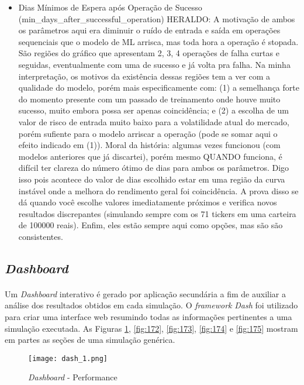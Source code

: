 \begin{itemize}
    \item Dias Mínimos de Espera após Operação de Sucesso (min\_days\_after\_successful\_operation)
    \color{red} HERALDO: A motivação de ambos os parâmetros aqui era diminuir o ruído de entrada e saída em operações sequenciais que o modelo de ML arrisca, mas toda hora a operação é stopada. São regiões do gráfico que apresentam 2, 3, 4 operações de falha curtas e seguidas, eventualmente com uma de sucesso e já volta pra falha. Na minha interpretação, os motivos da existência dessas regiões tem a ver com a qualidade do modelo, porém mais especificamente com: (1) a semelhança forte do momento presente com um passado de treinamento onde houve muito sucesso, muito embora possa ser apenas coincidência; e (2) a escolha de um valor de risco de entrada muito baixo para a volatilidade atual do mercado, porém sufiente para o modelo arriscar a operação (pode se somar aqui o efeito indicado em (1)). Moral da história: algumas vezes funcionou (com modelos anteriores que já discartei), porém mesmo QUANDO funciona, é difícil ter clareza do número ótimo de dias para ambos os parâmetros. Digo isso pois acontece do valor de dias escolhido estar em uma região da curva instável onde a melhora do rendimento geral foi coincidência. A prova disso se dá quando você escolhe valores imediatamente próximos e verifica novos resultados discrepantes (simulando sempre com os 71 tickers em uma carteira de 100000 reais). Enfim, eles estão sempre aqui como opções, mas são são consistentes. 
\end{itemize}



\FloatBarrier
\subsection{\textit{Dashboard}}

\paragraph{} Um \textit{Dashboard} interativo é gerado por aplicação secundária a fim de auxiliar a análise dos resultados obtidos em cada simulação. O \textit{framework} \textit{Dash} \cite{dash} foi utilizado para criar uma interface web resumindo todas as informações pertinentes a uma simulação executada. As Figuras \ref{fig:171}, \ref{fig:172}, \ref{fig:173}, \ref{fig:174} e \ref{fig:175} mostram em partes as seções de uma simulação genérica.

\begin{figure}[!htb]
    \texttt{[image: dash\_1.png]}
    \centering
    \caption{\textit{Dashboard} - Performance}
    \label{fig:171}
\end{figure}

